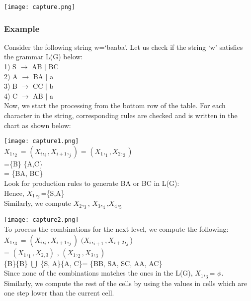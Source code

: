 \documentclass[12pt]{article}
\begin{document}
\vspace{10 mm}

\texttt{[image: capture.png]}\\
\subsubsection{Example}
Consider the following string w=‘baaba’. Let us check if the string ‘w’ satisfies the grammar L(G) below:\\
1)	S $\rightarrow$ AB $\mid$ BC\\
2)	A $\rightarrow$ BA $\mid$ a\\
3)	B $\rightarrow$ CC $\mid$ b\\
4)	C $\rightarrow$ AB $\mid$ a\\
Now, we start the processing from the bottom row of the table. For each character in the string, corresponding rules are checked and is written in the chart as shown below:

\vspace{10 mm}

\texttt{[image: capture1.png]}\\
$X_1,_2$ = $(X_i ,_i,X_{i+1} ,_ j)$ = $(X_1 ,_ 1   , X_2 ,_ 2)$\\
  =\{B\} \{A,C\}\\
  = \{BA, BC\}\\
  
  \vspace{1 mm}
Look for production rules to generate BA or BC in L(G):\\
Hence, $X_1,_2$=\{S,A\}\\
Similarly, we compute $X_2,_3$, $X_3,_4$,$ X_4,_5$

\vspace{10 mm}

\texttt{[image: capture2.png]}\\

To process the combinations for the next level, we compute the following:\\
$X_1 , _3 $	= $(X_i ,_i ,X_{i+1} , _j)$ $(X_i , _{i+1} ,X_{i+2} , _j$)\\  
	        = $(X_1, _1, X_{2,3})$ , $(X_1,_ 2,X_3,_ 3)$\\
\{B\}\{B\} $\bigcup$ \{S, A\}\{A, C\}= \{BB, SA, SC, AA, AC\}\\
Since none of the combinations matches the ones in the L(G), $X_1,_3$= $\phi$.\\
Similarly, we compute the rest of the cells by using the values in cells which are one step lower than the current cell.\\
\end{document}
